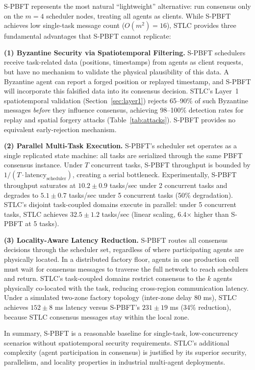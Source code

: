 \documentclass[manuscript,screen,review]{acmart}
\begin{document}
S-PBFT represents the most natural ``lightweight'' alternative: run consensus only on the $m=4$ scheduler nodes, treating all agents as clients. While S-PBFT achieves low single-task message count ($O(m^2) = 16$), STLC provides three fundamental advantages that S-PBFT cannot replicate:

\textbf{(1) Byzantine Security via Spatiotemporal Filtering.} S-PBFT schedulers receive task-related data (positions, timestamps) from agents as client requests, but have no mechanism to validate the physical plausibility of this data. A Byzantine agent can report a forged position or replayed timestamp, and S-PBFT will incorporate this falsified data into its consensus decision. STLC's Layer~1 spatiotemporal validation (Section~\ref{sec:layer1}) rejects 65--90\% of such Byzantine messages \emph{before} they influence consensus, achieving 98--100\% detection rates for replay and spatial forgery attacks (Table~\ref{tab:attacks}). S-PBFT provides no equivalent early-rejection mechanism.

\textbf{(2) Parallel Multi-Task Execution.} S-PBFT's scheduler set operates as a single replicated state machine: all tasks are serialized through the same PBFT consensus instance. Under $T$ concurrent tasks, S-PBFT throughput is bounded by $1 / (T \cdot \text{latency}_{\text{scheduler}})$, creating a serial bottleneck. Experimentally, S-PBFT throughput saturates at $10.2 \pm 0.9$ tasks/sec under 2 concurrent tasks and degrades to $5.1 \pm 0.7$ tasks/sec under 5 concurrent tasks (50\% degradation). STLC's disjoint task-coupled domains execute in parallel: under 5 concurrent tasks, STLC achieves $32.5 \pm 1.2$ tasks/sec (linear scaling, 6.4$\times$ higher than S-PBFT at 5 tasks).

\textbf{(3) Locality-Aware Latency Reduction.} S-PBFT routes all consensus decisions through the scheduler set, regardless of where participating agents are physically located. In a distributed factory floor, agents in one production cell must wait for consensus messages to traverse the full network to reach schedulers and return. STLC's task-coupled domains restrict consensus to the $k$ agents physically co-located with the task, reducing cross-region communication latency. Under a simulated two-zone factory topology (inter-zone delay 80 ms), STLC achieves $152 \pm 8$ ms latency versus S-PBFT's $231 \pm 19$ ms (34\% reduction), because STLC consensus messages stay within the local zone.

In summary, S-PBFT is a reasonable baseline for single-task, low-concurrency scenarios without spatiotemporal security requirements. STLC's additional complexity (agent participation in consensus) is justified by its superior security, parallelism, and locality properties in industrial multi-agent deployments.
\end{document}
